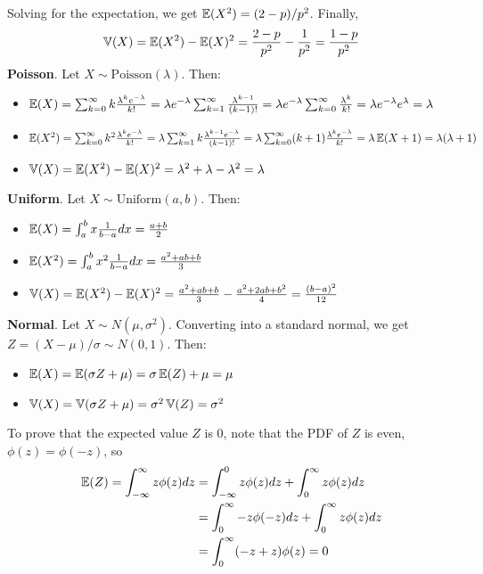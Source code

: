 Solving for the expectation, we get \(\operatorname{\mathbb{E}}(X^{2}) = (2 - p) / p^{2}\).
Finally,
\[
\operatorname{\mathbb{V}}(X) = \operatorname{\mathbb{E}}(X^{2}) - \operatorname{\mathbb{E}}(X)^{2} = \frac{2 - p}{p^{2}} - \frac{1}{p^{2}} = \frac{1 - p}{p^{2}}
\]
\textbf{Poisson}. Let \(X \sim \text{Poisson}(\lambda)\). Then:
\begin{itemize}
\item
  \( \operatorname{\mathbb{E}}(X) = \sum_{k=0}^{\infty} k
  \frac{\lambda^{k} e^{-\lambda}}{k!} = \lambda e^{-\lambda}
  \sum_{k=1}^{\infty} \frac{\lambda^{k - 1} }{(k - 1)!} =
  \lambda e^{-\lambda} \sum_{k=0}^{\infty} \frac{\lambda^{k}}{k!}
  = \lambda e^{-\lambda} e^{\lambda} = \lambda \)
\item
  \( \operatorname{\mathbb{E}}(X^{2}) = \sum_{k=0}^{\infty}k^{2}
  \frac{\lambda^{k} e^{-\lambda}}{k!} = \lambda \sum_{k=1}^{\infty} k
  \frac{\lambda^{k-1} e^{-\lambda} }{(k-1)!} =
  \lambda \sum_{k=0}^{\infty} (k + 1)
  \frac{\lambda^{k} e^{-\lambda} }{k!} = \lambda \operatorname{\mathbb{E}}(X + 1) =
  \lambda(\lambda + 1) \)
\item
  \( \operatorname{\mathbb{V}}(X) = \operatorname{\mathbb{E}}(X^{2}) - \operatorname{\mathbb{E}}(X)^{2} =
  \lambda^{2} + \lambda - \lambda^{2} = \lambda \)
\end{itemize}
\textbf{Uniform}. Let \(X \sim \text{Uniform}(a, b)\). Then:
\begin{itemize}[tightlist]
\item
  \(\operatorname{\mathbb{E}}(X) = \int_a^{b} x \frac{1}{b - a} dx = \frac{a + b}{2}\)
\item
  \(\operatorname{\mathbb{E}}(X^{2}) = \int_a^{b} x^{2} \frac{1}{b - a} dx = \frac{a^{2} + ab + b}{3}\)
\item
  \(\operatorname{\mathbb{V}}(X) = \operatorname{\mathbb{E}}(X^{2}) - \operatorname{\mathbb{E}}(X)^{2} = \frac{a^{2} + ab + b}{3} - \frac{a^{2} + 2ab + b^{2}}{4} = \frac{(b - a)^{2}}{12}\)
\end{itemize}
\textbf{Normal}. Let \(X \sim N(\mu, \sigma^{2})\). Converting into a
standard normal, we get \(Z = (X - \mu) / \sigma \sim N(0, 1)\). Then:
\begin{itemize}[tightlist]
\item
  $ \operatorname{\mathbb{E}}(X) = \operatorname{\mathbb{E}}(\sigma Z + \mu) = \sigma \operatorname{\mathbb{E}}(Z) +
  \mu = \mu$
\item
  $ \operatorname{\mathbb{V}}(X) = \operatorname{\mathbb{V}}(\sigma Z + \mu) = \sigma^{2}
  \operatorname{\mathbb{V}}(Z) = \sigma^{2}$
\end{itemize}
To prove that the expected value \(Z\) is 0, note that the PDF of \(Z\)
is even, \(\phi(z) = \phi(-z)\), so
\begin{align*}
\operatorname{\mathbb{E}}(Z) 
  = \int_{-\infty}^{\infty} z \phi(z) dz 
& = \int_{-\infty}^{0} z \phi(z) dz + \int_{0}^{\infty} z \phi(z) dz 
\\
& = \int_{0}^{\infty} -z \phi(-z) dz + \int_{0}^{\infty} z \phi(z) dz 
\\
& = \int_{0}^{\infty} (-z + z)\phi(z) = 0 
\end{align*}
